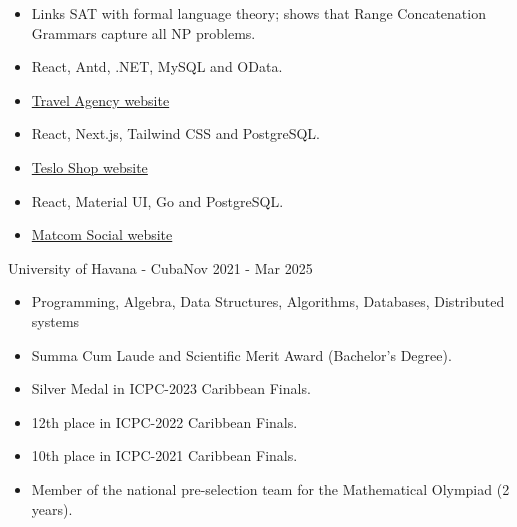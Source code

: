 



\begin{itemize}
	\item Links SAT with formal language theory; shows that Range Concatenation Grammars capture all NP problems.
\end{itemize}

\divider


\begin{itemize}
	\item React, Antd, .NET, MySQL and OData.
	\item \href{https://travel-agency-client.onrender.com/}{Travel Agency website}
\end{itemize}

\divider


\begin{itemize}
    \item React, Next.js, Tailwind CSS and PostgreSQL.
    \item \href{https://teslo-shop-phi.vercel.app/}{Teslo Shop website}
\end{itemize}

\divider


\begin{itemize}
    \item React, Material UI, Go and PostgreSQL.
    \item \href{https://social-network-client-6f8h.onrender.com/}{Matcom Social website}
\end{itemize}


{University of Havana - Cuba}{Nov 2021 - Mar 2025}{}
\begin{itemize}
    \item Programming, Algebra, Data Structures, Algorithms, Databases, Distributed systems
\end{itemize}


\begin{itemize}
    \item Summa Cum Laude and Scientific Merit Award (Bachelor's Degree).
    \item Silver Medal in ICPC-2023 Caribbean Finals.
    \item 12th place in ICPC-2022 Caribbean Finals.
    \item 10th place in ICPC-2021 Caribbean Finals.
    \item Member of the national pre-selection team for the Mathematical Olympiad (2 years).

\end{itemize}


